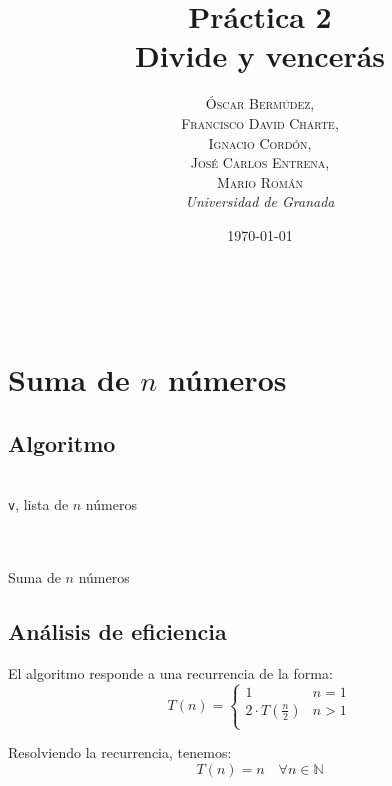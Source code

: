 \documentclass[a4paper, 11pt]{article} %
\title{\textbf{Práctica 2}\\ %
Divide y vencerás} %
\author{\textsc{Óscar Bermúdez,\\Francisco David Charte,\\Ignacio Cordón,\\José Carlos Entrena,\\Mario Román} %
\\{\textit{Universidad de Granada}}} %
\date{\today} %
\makeatletter
\renewcommand{\maketitle}{ %
\begin{flushright} %
{\LARGE\@title} %

\vspace{50pt} %

{\large\@author} %
\\\@date %

\vspace{40pt} %
\end{flushright}
}
\makeatother
\begin{document}
\maketitle %

\renewcommand{\abstractname}{Resumen} %
\begin{abstract}

\end{abstract}
{\parskip=2pt
\tableofcontents
}
\pagebreak

\section {Suma de $n$ números}
\subsection{Algoritmo}
\begin{algorithm}[H]
	\begin{algorithmic}[1]
		\REQUIRE \ \\
        	\texttt{v}, lista de $n$ números\\
	\ELSE
    	\ENDIF \\\
	\end{algorithmic}
    \caption{Suma de $n$ números}
    \label{suma}
\end{algorithm}

\subsection{Análisis de eficiencia}
El algoritmo responde a una recurrencia de la forma:
\begin{equation}
 T(n)=\left\lbrace
	    \begin{array}{lr}
            1 & n=1\\
            2\cdot T\left(\frac{n}{2}\right) & n>1\\
            \end{array}
	    \right.
\end{equation}

Resolviendo la recurrencia, tenemos:
\begin{equation}
 T(n)=n\quad \forall n\in \mathbb{N}
\end{equation}
\end{document}
